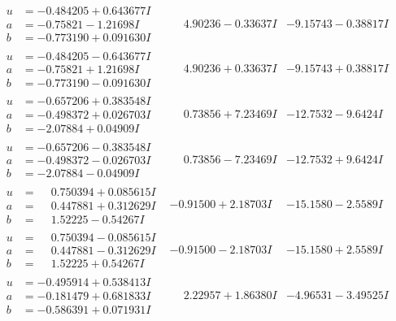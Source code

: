 \documentclass[1p]{elsarticle_modified}
\theoremstyle{definition}
\begin{document}
$$\begin{array}{c|c|c}
\begin{aligned}
u &= -0.484205 + 0.643677 I \\
a &= -0.75821 - 1.21698 I \\
b &= -0.773190 + 0.091630 I\end{aligned}
 & \phantom{-}4.90236 - 0.33637 I & -9.15743 - 0.38817 I \\ \hline\begin{aligned}
u &= -0.484205 - 0.643677 I \\
a &= -0.75821 + 1.21698 I \\
b &= -0.773190 - 0.091630 I\end{aligned}
 & \phantom{-}4.90236 + 0.33637 I & -9.15743 + 0.38817 I \\ \hline\begin{aligned}
u &= -0.657206 + 0.383548 I \\
a &= -0.498372 + 0.026703 I \\
b &= -2.07884 + 0.04909 I\end{aligned}
 & \phantom{-}0.73856 + 7.23469 I & -12.7532 - 9.6424 I \\ \hline\begin{aligned}
u &= -0.657206 - 0.383548 I \\
a &= -0.498372 - 0.026703 I \\
b &= -2.07884 - 0.04909 I\end{aligned}
 & \phantom{-}0.73856 - 7.23469 I & -12.7532 + 9.6424 I \\ \hline\begin{aligned}
u &= \phantom{-}0.750394 + 0.085615 I \\
a &= \phantom{-}0.447881 + 0.312629 I \\
b &= \phantom{-}1.52225 - 0.54267 I\end{aligned}
 & -0.91500 + 2.18703 I & -15.1580 - 2.5589 I \\ \hline\begin{aligned}
u &= \phantom{-}0.750394 - 0.085615 I \\
a &= \phantom{-}0.447881 - 0.312629 I \\
b &= \phantom{-}1.52225 + 0.54267 I\end{aligned}
 & -0.91500 - 2.18703 I & -15.1580 + 2.5589 I \\ \hline\begin{aligned}
u &= -0.495914 + 0.538413 I \\
a &= -0.181479 + 0.681833 I \\
b &= -0.586391 + 0.071931 I\end{aligned}
 & \phantom{-}2.22957 + 1.86380 I & -4.96531 - 3.49525 I \\ \hline\begin{aligned}

\end{aligned}
\end{array}$$
\end{document}
